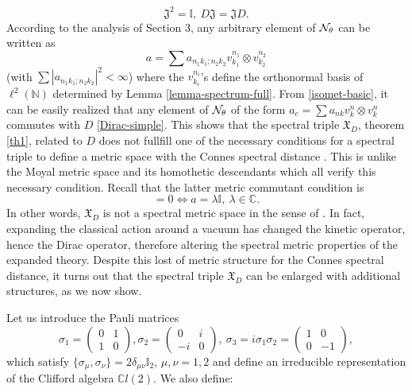 \documentclass[a4paper,11pt,twoside]{article}
\numberwithin{equation}{section}
\newcommand\bbone{{ \mathbb{I}}}
\theoremstyle{nonumberplain}
\newcounter{and}
\begin{document}
\begin{equation}
\mathfrak{J}^2=\bbone,\ D\mathfrak{J}=\mathfrak{J}D\label{commut-1}. 
\end{equation}
According to the analysis of Section 3, any arbitrary element of ${\cal{N}}_\theta$ can be written as 
\begin{equation}
a=\sum a_{n_1k_1;n_2k_2}v^{n_1}_{k_1}\otimes v^{n_2}_{k_2}
\end{equation}
(with $\sum |a_{n_1k_1;n_2k_2} |^2<\infty$) where the $v^{n_i}_{k_i}$'s define the orthonormal basis of $\ell^2(\mathbb{N})$ determined by Lemma \ref{lemma-spectrum-full}. From \eqref{isomet-basic}, it can be easily realized that any element of ${\cal{N}}_\theta$ of the form $a_c=\sum a_{nk}v^n_k\otimes v^n_k$ commutes with $D$ \eqref{Dirac-simple}. This shows that the spectral triple $\mathfrak{X}_D$, theorem \ref{th1}, related to $D$ does not fullfill one of the necessary conditions for a spectral triple to define a metric space with the Connes spectral distance \cite{Rieffel}. This is unlike the Moyal metric space and its homothetic descendants which all verify this necessary condition. Recall that the latter metric commutant condition is 
\begin{equation}
[D,\eta(a)]=0\iff a=\lambda\bbone,\ \lambda\in\mathbb{C}. 
\end{equation}
In other words, $\mathfrak{X}_D$ is not a spectral metric space in the sense of \cite{homot-moyal,bel-mar}. In fact, expanding the classical action around a vacuum has changed the kinetic operator, hence the Dirac operator, therefore altering the spectral metric properties of the expanded theory. Despite this lost of metric structure for the Connes spectral distance, it turns out that the spectral triple $\mathfrak{X}_D$ can be enlarged with additional structures, as we now show.\par
Let us introduce the Pauli matrices
\begin{equation}
\sigma_1=\begin{pmatrix}
0&1\\ 
1&0
\end{pmatrix}, \sigma_2=\begin{pmatrix}
0&i\\ 
-i&0
\end{pmatrix},\ \sigma_3=i\sigma_1\sigma_2=\begin{pmatrix}
1&0\\
0&-1\end{pmatrix},
\end{equation}
which satisfy $\{\sigma_\mu,\sigma_\nu\}=2\delta_{\mu\nu}\bbone_2$, $\mu,\nu=1,2$ and define an irreducible representation of the Clifford algebra $\mathbb{C}l(2)$. We also define:
\end{document}

